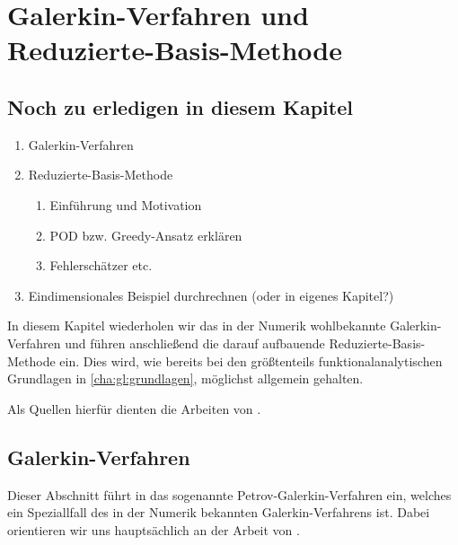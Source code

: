 
\iftoggle{dictum}{
    \setchapterpreamble[ul][0.6\textwidth]{%
        \dictum[Alfréd Rényi]{\enquote{A mathematician is a device for turning coffee into theorems.}}
        \vspace*{2\baselineskip}
    }
}{}
\chapter{Galerkin-Verfahren und Reduzierte-Basis-Methode} %
\label{cha:grb:galerkin_und_reduzierte_basis}

\section*{Noch zu erledigen in diesem Kapitel} %

\begin{enumerate}
    \item Galerkin-Verfahren
    \item Reduzierte-Basis-Methode
    \begin{enumerate}
        \item Einführung und Motivation
        \item POD bzw. Greedy-Ansatz erklären
        \item Fehlerschätzer etc.
    \end{enumerate}
    \item Eindimensionales Beispiel durchrechnen (oder in eigenes Kapitel?)
\end{enumerate}


\clearpage

In diesem Kapitel wiederholen wir das in der Numerik wohlbekannte Galerkin-Verfahren und führen anschließend die darauf aufbauende Reduzierte-Basis-Methode ein.
Dies wird, wie bereits bei den größtenteils funktionalanalytischen Grundlagen in \cref{cha:gl:grundlagen}, möglichst allgemein gehalten.

Als Quellen hierfür dienten die Arbeiten von \textcite{Braess:2007wm,Patera:2007un,Quarteroni:2011jm}.

\section{Galerkin-Verfahren} %
\label{sec:grb:gv:galerkin_verfahren}

Dieser Abschnitt führt in das sogenannte Petrov-Galerkin-Verfahren ein, welches ein Speziallfall des in der Numerik bekannten Galerkin-Verfahrens ist.
Dabei orientieren wir uns hauptsächlich an der Arbeit von \textcite[Section 3.1]{Nochetto:2009il}.

